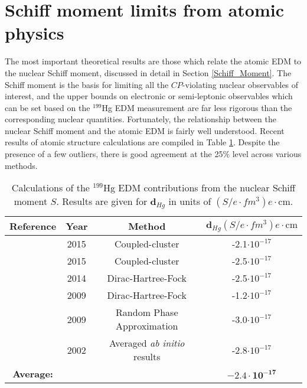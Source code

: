\documentclass [10pt, twoside] {uwthesis}[2012/04/02]
\begin{document}
\section{Schiff moment limits from atomic physics}
The most important theoretical results are those which relate the atomic EDM to the nuclear Schiff moment, discussed in detail in Section \ref{Schiff_Moment}. The Schiff moment is the basis for limiting all the $CP$-violating nuclear observables of interest, and the upper bounds on electronic or semi-leptonic observables which can be set based on the $^{199}$Hg EDM measurement are far less rigorous than the corresponding nuclear quantities. Fortunately, the relationship between the nuclear Schiff moment and the atomic EDM is fairly well understood. Recent results of atomic structure calculations are compiled in Table \ref{SchiffMomentValues}. Despite the presence of a few outliers, there is good agreement at the 25\% level across various methods.
\begin{table}[t] 									%
\begin{center} 																	%
\caption[Schiff moment contributions to $^{199}$Hg EDM]
{\narrower Calculations of the $^{199}$Hg EDM contributions from the nuclear Schiff moment $S$. Results are given for $\mathbf{d}_{Hg}$ in units of $\left(S/e \cdot  fm^3\right) e\cdot \text{cm}$.}\label{SchiffMomentValues} 
\begin{tabular}{cccc}	 														%
\hline \hline                													%
Reference & Year  & Method & $\mathbf{d}_{Hg} \left(S/e \cdot  fm^3\right) e\cdot \text{cm}$  \\ [0.5ex]	
\hline                   														%
\cite{2015_Singh_and_Sahoo_Hg_Schiff_Moment}& 2015 & Coupled-cluster						&-2.1$\cdot 10^{-17}$ \\ 
\cite{2009_Latha_et_al_Hg_EDM, 2015_Latha_et_al_Hg_EDM_Correction}	& 2015 & Coupled-cluster 						&-2.5$\cdot 10^{-17}$ \\
\cite{2014_Radziute_et_al_DHF_EDM}         	& 2014 & Dirac-Hartree-Fock						&-2.5$\cdot 10^{-17}$ \\ 
\cite{2009_Dzuba_Flambaum_Porsev_EDMvSM}   	& 2009 & Dirac-Hartree-Fock						&-1.2$\cdot 10^{-17}$ \\
\cite{2009_Dzuba_Flambaum_Porsev_EDMvSM}   	& 2009 & Random Phase Approximation				&-3.0$\cdot 10^{-17}$ \\
\cite{2002_Dzuba_et._al._EDMvsSM} 		  	& 2002 & Averaged \textit{ab initio} results	&-2.8$\cdot 10^{-17}$ \\
\hline
\textbf{Average:}							&	   &								&$\mathbf{-2.4\cdot 10^{-17}}$\\
\hline 
\hline																			%
\end{tabular}  
\end{center}
\end{table}	
	
\end{document}
